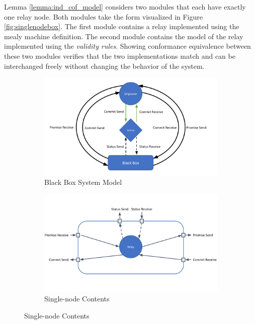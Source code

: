 \documentclass[runningheads]{llncs}
\newcommand{\figref}[1]{Figure \ref{#1}}
\begin{document}
Lemma \ref{lemma:ind_cof_model} considers two modules that each have exactly one relay node. Both modules take the form visualized in \figref{fig:singlenodebox}. The first module contains a relay implemented using the mealy machine definition. The second module contains the model of the relay implemented using the \emph{validity rules}. Showing conformance equivalence between these two modules verifies that the two implementations match and can be interchanged freely without changing the behavior of the system. 

\begin{figure}
     \centering
     \begin{subfigure}[b]{\textwidth}
         \centering
         \includegraphics[width=\textwidth]{paper/SystemBlackBoxModel.png}
         \caption{Black Box System Model}
         \label{fig:blackboxsystem}
     \end{subfigure}
     \hfill
     \begin{subfigure}[b]{0.4\textwidth}
         \centering
         \includegraphics[width=1.4\textwidth]{paper/SingleNodeBlackBox.png}
         \caption{Single-node Contents}

\end{subfigure}
\end{figure}
\end{document}
